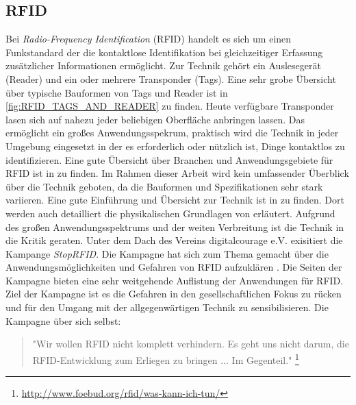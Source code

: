 \subsection{RFID}
%
Bei \textit{Radio-Frequency Identification} (RFID) handelt es sich um einen Funkstandard der die kontaktlose Identifikation bei gleichzeitiger Erfassung zusätzlicher Informationen ermöglicht. Zur Technik gehört ein Auslesegerät (Reader) und ein oder mehrere Transponder (Tags). Eine sehr grobe Übersicht über typische Bauformen von Tags und Reader ist in \ref{fig:RFID_TAGS_AND_READER} zu finden.  Heute verfügbare Transponder lasen sich auf nahezu jeder beliebigen Oberfläche anbringen lassen. Das ermöglicht ein großes Anwendungsspekrum, praktisch wird die Technik in jeder Umgebung eingesetzt in der es erforderlich oder nützlich ist, Dinge kontaktlos zu identifizieren. Eine gute Übersicht über Branchen und Anwendungsgebiete für RFID ist in \cite{RFIDJournal} zu finden. Im Rahmen dieser Arbeit wird kein umfassender Überblick über die Technik geboten, da die Bauformen und Spezifikationen sehr stark variieren. Eine gute Einführung und Übersicht zur Technik ist in \cite{finkenzeller2008rfid} zu finden. Dort werden auch detailliert die physikalischen Grundlagen von erläutert. Aufgrund des großen Anwendungsspektrums und der weiten Verbreitung ist die Technik in die Kritik geraten. Unter dem Dach des Vereins digitalcourage e.V. exisitiert die Kampange \textit{StopRFID}. Die Kampagne hat sich zum Thema gemacht über die Anwendungsmöglichkeiten und Gefahren von RFID aufzuklären \cite{stoprfid2013}. Die Seiten der Kampagne bieten eine sehr weitgehende Auflistung der Anwendungen für RFID. Ziel der Kampagne ist es die Gefahren in den gesellschaftlichen Fokus zu rücken und für den Umgang mit der allgegenwärtigen Technik zu sensibilisieren. Die Kampagne über sich selbst:
\begin{quote}
"Wir wollen RFID nicht komplett verhindern. Es geht uns nicht darum, die RFID-Entwicklung zum Erliegen zu bringen ... Im Gegenteil." \footnote{\url{http://www.foebud.org/rfid/was-kann-ich-tun/}}
\end{quote}
%
